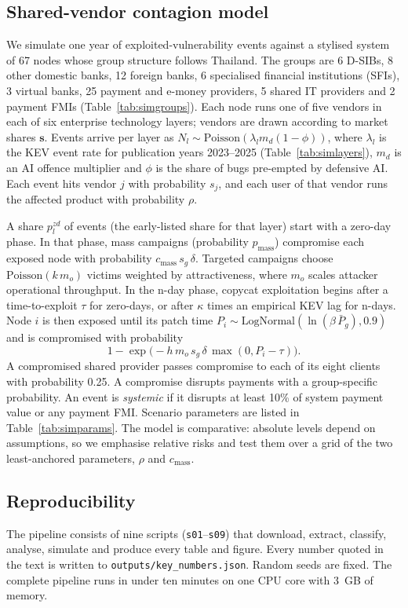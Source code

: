 \documentclass[11pt,a4paper]{article}
\begin{document}
\subsection{Shared-vendor contagion model}\label{sec:model}
We simulate one year of exploited-vulnerability events against a stylised system of 67 nodes whose group structure follows Thailand. The groups are 6 D-SIBs, 8 other domestic banks, 12 foreign banks, 6 specialised financial institutions (SFIs), 3 virtual banks, 25 payment and e-money providers, 5 shared IT providers and 2 payment FMIs (Table~\ref{tab:simgroups}). Each node runs one of five vendors in each of six enterprise technology layers; vendors are drawn according to market shares $\mathbf{s}$. Events arrive per layer as $N_l\sim\text{Poisson}(\lambda_l m_d (1-\phi))$, where $\lambda_l$ is the KEV event rate for publication years 2023--2025 (Table~\ref{tab:simlayers}), $m_d$ is an AI offence multiplier and $\phi$ is the share of bugs pre-empted by defensive AI. Each event hits vendor $j$ with probability $s_j$, and each user of that vendor runs the affected product with probability $\rho$.

A share $p^{zd}_l$ of events (the early-listed share for that layer) start with a zero-day phase. In that phase, mass campaigns (probability $p_{\text{mass}}$) compromise each exposed node with probability $c_{\text{mass}}\,s_g\,\delta$. Targeted campaigns choose $\text{Poisson}(k\,m_o)$ victims weighted by attractiveness, where $m_o$ scales attacker operational throughput. In the n-day phase, copycat exploitation begins after a time-to-exploit $\tau$ for zero-days, or after $\kappa$ times an empirical KEV lag for n-days. Node $i$ is then exposed until its patch time $P_i\sim\text{LogNormal}(\ln(\beta\,\bar P_g),0.9)$ and is compromised with probability
\begin{equation}
1-\exp\!\big(-h\,m_o\,s_g\,\delta\,\max(0,P_i-\tau)\big).
\end{equation}
A compromised shared provider passes compromise to each of its eight clients with probability 0.25. A compromise disrupts payments with a group-specific probability. An event is \emph{systemic} if it disrupts at least 10\% of system payment value or any payment FMI. Scenario parameters are listed in Table~\ref{tab:simparams}. The model is comparative: absolute levels depend on assumptions, so we emphasise relative risks and test them over a grid of the two least-anchored parameters, $\rho$ and $c_{\text{mass}}$.

\subsection{Reproducibility}
The pipeline consists of nine scripts (\texttt{s01}--\texttt{s09}) that download, extract, classify, analyse, simulate and produce every table and figure. Every number quoted in the text is written to \texttt{outputs/key\_numbers.json}. Random seeds are fixed. The complete pipeline runs in under ten minutes on one CPU core with 3~GB of memory.








\end{document}
